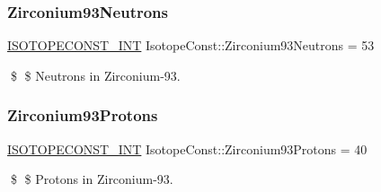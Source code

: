 \subsubsection{\texorpdfstring{Zirconium93\+Neutrons}{Zirconium93Neutrons}}
{\footnotesize\ttfamily \mbox{\hyperlink{group___isotope_const-_macros_ga5f18360b3e99483a35c32d789e62621c}{I\+S\+O\+T\+O\+P\+E\+C\+O\+N\+S\+T\+\_\+\+I\+NT}} Isotope\+Const\+::\+Zirconium93\+Neutrons = 53}

\$ \$ Neutrons in Zirconium-\/93. \mbox{\label{group___isotope_const-_zirconium-_zr93_ga2cd160acd22d23187997851a770be874}} 
\subsubsection{\texorpdfstring{Zirconium93\+Protons}{Zirconium93Protons}}
{\footnotesize\ttfamily \mbox{\hyperlink{group___isotope_const-_macros_ga5f18360b3e99483a35c32d789e62621c}{I\+S\+O\+T\+O\+P\+E\+C\+O\+N\+S\+T\+\_\+\+I\+NT}} Isotope\+Const\+::\+Zirconium93\+Protons = 40}

\$ \$ Protons in Zirconium-\/93. 